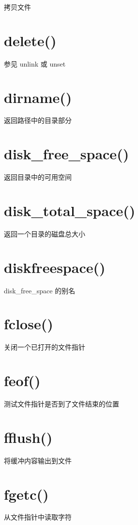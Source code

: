 拷贝文件

\section{delete()}

参见 unlink 或 unset

\section{dirname()}

返回路径中的目录部分

\section{disk\_free\_space()}

返回目录中的可用空间

\section{disk\_total\_space()}

返回一个目录的磁盘总大小

\section{diskfreespace()}

disk\_free\_space 的别名

\section{fclose()}

关闭一个已打开的文件指针

\section{feof()}

测试文件指针是否到了文件结束的位置

\section{fflush()}

将缓冲内容输出到文件

\section{fgetc()}

从文件指针中读取字符

